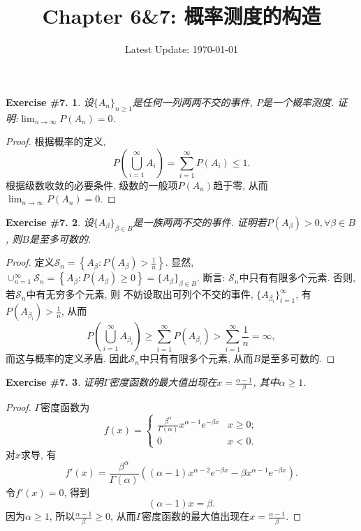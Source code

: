 \documentclass[UTF8, a4paper]{article}
\title{Chapter 6\&7: 概率测度的构造}
\author{}
\date{Latest Update: \today}
\newtheorem{exercise}{Exercise \#7.}
\begin{document}
\maketitle


\begin{framed}
\begin{exercise}
设$\{A_n\}_{n \geq 1}$是任何一列两两不交的事件, $P$是一个概率测度. 证明:$\lim_{n\to\infty} P(A_n) = 0$.
\end{exercise}
\end{framed}
\begin{proof}
根据概率的定义, 
$$
P\left(\bigcup_{i=1}^{\infty} A_i\right)  = \sum_{i=1}^{\infty} P(A_i)\leq 1.
$$
根据级数收敛的必要条件, 级数的一般项\(P(A_n)\)趋于零, 从而$\lim_{n\to\infty} P(A_n) = 0$.
\end{proof}

\begin{framed}
\begin{exercise}
设$\{A_\beta\}_{\beta \in B}$是一族两两不交的事件. 证明若$P(A_\beta) > 0, \forall \beta \in B$, 则$B$是至多可数的.
\end{exercise}
\end{framed}


\begin{proof}
定义\(\mathcal{S}_n = \left\{A_\beta: P(A_\beta) > \frac{1}{n}\right\}\).
显然, \(\cup_{n = 1}^{\infty} \mathcal{S}_n = \left\{A_\beta: P(A_\beta) \geq 0\right\} = \{A_\beta\}_{\beta \in B}\).
断言: \(\mathcal{S}_n\)中只有有限多个元素. 否则, 若\(\mathcal{S}_n\)中有无穷多个元素, 则
不妨设取出可列个不交的事件, \(\{A_{\beta_i}\}_{i=1}^{\infty}\), 有\(P(A_{\beta_i}) > \frac{1}{n}\), 从而
$$
P\left(\bigcup_{i=1}^{\infty} A_{\beta_i}\right) \geq \sum_{i=1}^{\infty} P(A_{\beta_i}) > \sum_{i=1}^{\infty} \frac{1}{n} = \infty,
$$
而这与概率的定义矛盾. 因此\(\mathcal{S}_n\)中只有有限多个元素, 从而\(B\)是至多可数的.
\end{proof}


\begin{framed}
\begin{exercise}
证明$\Gamma$密度函数的最大值出现在$x = \frac{\alpha - 1}{\beta}$, 其中$\alpha \geq 1$.
\end{exercise}
\end{framed}

\begin{proof}
\(\Gamma\)密度函数为
$$
f(x)= \begin{cases}\frac{\beta^\alpha}{\Gamma(\alpha)} x^{\alpha-1} e^{-\beta x} & x \geq 0; \\ 0 & x<0.\end{cases}
$$
对\(x\)求导, 有
$$
f'(x) = \frac{\beta^\alpha}{\Gamma(\alpha)}\left((\alpha - 1)x^{\alpha - 2}e^{-\beta x} - \beta x^{\alpha - 1}e^{-\beta x}\right).
$$
令\(f'(x) = 0\), 得到
$$
(\alpha - 1)x = \beta.
$$
因为\(\alpha \geq 1\), 所以\(\frac{\alpha - 1}{\beta} \geq 0\), 从而\(\Gamma\)密度函数的最大值出现在\(x = \frac{\alpha - 1}{\beta}\).

\end{proof}
\end{document}
